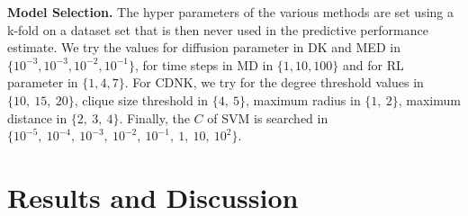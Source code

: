 \documentclass{esannV2}
\begin{document}
\textbf{Model Selection.}
The hyper parameters of the various methods are set using a k-fold on a
dataset set that is then never used in the predictive performance estimate. We
try the values for diffusion parameter in DK and MED in $\lbrace 10^{-3},
10^{-3}, 10^{-2}, 10^{-1} \rbrace$, for time steps in MD in $\lbrace 1, 10,
100 \rbrace$ and for RL parameter in $\lbrace 1, 4, 7 \rbrace$. For CDNK, we
try for the degree threshold values in $\lbrace 10,\ 15,\ 20 \rbrace$, clique size
threshold in $\lbrace 4,\ 5 \rbrace$, maximum radius in $\lbrace 1,\ 2
\rbrace$, maximum distance in $\lbrace 2,\ 3,\ 4 \rbrace$. Finally, the $C$ of
SVM is searched in $\lbrace 10^{-5},  \ 10^{-4}, \ 10^{-3},\ 10^{-2},\ 10^{-1},\
1,\ 10,\ 10^2 \rbrace$.

\section{Results and Discussion}
\label{results_discussion}
\end{document}
